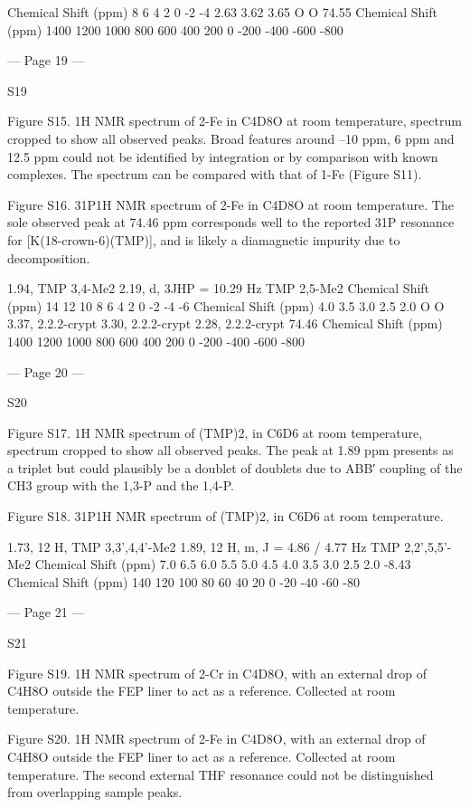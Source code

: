  
Chemical Shift (ppm)
8
6
4
2
0
-2
-4
2.63
3.62
3.65
O
O
74.55
Chemical Shift (ppm)
1400
1200
1000
800
600
400
200
0
-200
-400
-600
-800


--- Page 19 ---
 
 
S19 
 
 
 
Figure S15. 1H NMR spectrum of 2-Fe in C4D8O at room temperature, spectrum cropped to show all observed peaks. Broad 
features around –10 ppm, 6 ppm and 12.5 ppm could not be identified by integration or by comparison with known complexes. 
The spectrum can be compared with that of 1-Fe (Figure S11). 
 
 
Figure S16. 31P{1H} NMR spectrum of 2-Fe in C4D8O at room temperature. The sole observed peak at 74.46 ppm corresponds 
well to the reported 31P resonance for [K(18-crown-6)(TMP)], and is likely a diamagnetic impurity due to decomposition. 
 
 
1.94,
TMP 3,4-Me2
2.19, 
d, 3JHP = 10.29 Hz
TMP 2,5-Me2
Chemical Shift (ppm)
14
12
10
8
6
4
2
0
-2
-4
-6
Chemical Shift (ppm)
4.0
3.5
3.0
2.5
2.0
O
O
3.37,
2.2.2-crypt
3.30,
2.2.2-crypt
2.28,
2.2.2-crypt
74.46
Chemical Shift (ppm)
1400
1200
1000
800
600
400
200
0
-200
-400
-600
-800


--- Page 20 ---
 
 
S20 
 
 
 
Figure S17. 1H NMR spectrum of (TMP)2, in C6D6 at room temperature, spectrum cropped to show all observed peaks. The 
peak at 1.89 ppm presents as a triplet but could plausibly be a doublet of doublets due to ABB′ coupling of the CH3 group with 
the 1,3-P and the 1,4-P. 
 
 
Figure S18. 31P{1H} NMR spectrum of (TMP)2, in C6D6 at room temperature. 
 
 
1.73, 12 H,
TMP 3,3',4,4'-Me2
1.89, 12 H, 
m, J = 4.86 / 4.77 Hz
TMP 2,2',5,5'-Me2
Chemical Shift (ppm)
7.0
6.5
6.0
5.5
5.0
4.5
4.0
3.5
3.0
2.5
2.0
-8.43
Chemical Shift (ppm)
140
120
100
80
60
40
20
0
-20
-40
-60
-80


--- Page 21 ---
 
 
S21 
 
 
 
Figure S19. 1H NMR spectrum of 2-Cr in C4D8O, with an external drop of C4H8O outside the FEP liner to act as a reference. 
Collected at room temperature. 
 
 
Figure S20. 1H NMR spectrum of 2-Fe in C4D8O, with an external drop of C4H8O outside the FEP liner to act as a reference. 
Collected at room temperature. The second external THF resonance could not be distinguished from overlapping sample peaks. 
 
